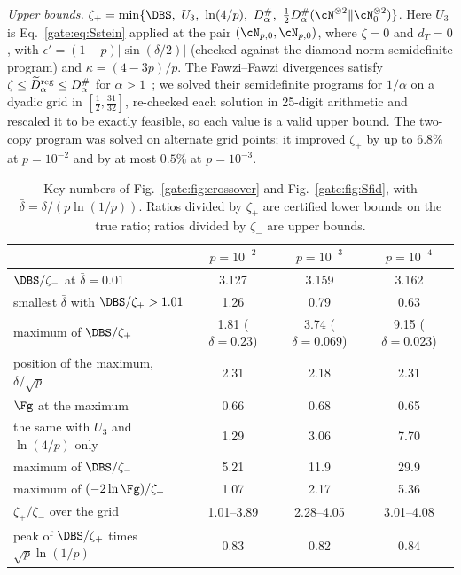 \emph{Upper bounds.} $\zeta_+=\min\{\DBS,\ U_3,\ \ln(4/p),\ D^\#_\alpha,\ \frac12D^\#_\alpha(\cN^{\otimes2}\|\cN_0^{\otimes2})\}$. Here $U_3$ is Eq.~\eqref{gate:eq:Sstein} applied at the pair $(\cN_{p,0},\cN_{p,0})$, where $\zeta=0$ and $d_T=0$, with $\epsilon'=(1-p)|\sin(\delta/2)|$ (checked against the diamond-norm semidefinite program) and $\kappa=(4-3p)/p$. The Fawzi--Fawzi divergences satisfy $\zeta\le\widetilde D^{\rm reg}_\alpha\le D^\#_\alpha$ for $\alpha>1$~\cite{FawziFawzi2021}; we solved their semidefinite programs for $1/\alpha$ on a dyadic grid in $[\frac12,\frac{31}{32}]$, re-checked each solution in 25-digit arithmetic and rescaled it to be exactly feasible, so each value is a valid upper bound. The two-copy program was solved on alternate grid points; it improved $\zeta_+$ by up to $6.8\%$ at $p=10^{-2}$ and by at most $0.5\%$ at $p=10^{-3}$.

\begin{table}[!tbp]
\centering
\caption{Key numbers of Fig.~\ref{gate:fig:crossover} and Fig.~\ref{gate:fig:Sfid}, with $\bar\delta=\delta/(p\ln(1/p))$. Ratios divided by $\zeta_+$ are certified lower bounds on the true ratio; ratios divided by $\zeta_-$ are upper bounds.}
\label{gate:tab:Scross}
\begin{tabular}{lccc}
\toprule
 & $p=10^{-2}$ & $p=10^{-3}$ & $p=10^{-4}$\\
\midrule
$\DBS/\zeta_-$ at $\bar\delta=0.01$ & 3.127 & 3.159 & 3.162\\
smallest $\bar\delta$ with $\DBS/\zeta_+>1.01$ & 1.26 & 0.79 & 0.63\\
maximum of $\DBS/\zeta_+$ & 1.81 ($\delta=0.23$) & 3.74 ($\delta=0.069$) & 9.15 ($\delta=0.023$)\\
position of the maximum, $\delta/\sqrt p$ & 2.31 & 2.18 & 2.31\\
$\Fg$ at the maximum & 0.66 & 0.68 & 0.65\\
the same with $U_3$ and $\ln(4/p)$ only & 1.29 & 3.06 & 7.70\\
maximum of $\DBS/\zeta_-$ & 5.21 & 11.9 & 29.9\\
maximum of $(-2\ln\Fg)/\zeta_+$ & 1.07 & 2.17 & 5.36\\
$\zeta_+/\zeta_-$ over the grid & 1.01--3.89 & 2.28--4.05 & 3.01--4.08\\
peak of $\DBS/\zeta_+$ times $\sqrt p\ln(1/p)$ & 0.83 & 0.82 & 0.84\\
\bottomrule
\end{tabular}
\end{table}


